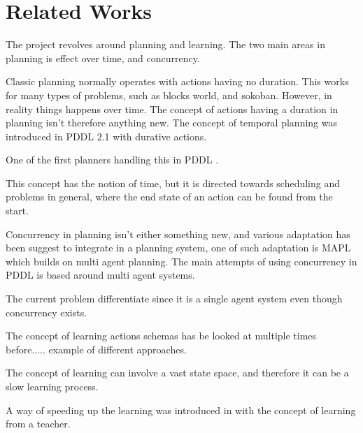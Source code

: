 \section{Related Works}
The project revolves around planning and learning. The two main areas in planning is effect over time, and concurrency. 

Classic planning normally operates with actions having no duration. This works for many types of problems, such as blocks world, and sokoban. However, in reality things happens over time. The concept of actions having a duration in planning isn't therefore anything new. The concept of temporal planning was introduced in PDDL 2.1 with durative actions. 

One of the first planners handling this in PDDL \cite{durative}. 

This concept has the notion of time, but it is directed towards scheduling and problems in general, where the end state of an action can be found from the start.
%
%	
%
%	
%	



Concurrency in planning isn't either something new, and various adaptation has been suggest to integrate in a planning system, one of such adaptation is MAPL which builds on multi agent planning\cite{mapl}. The main attempts of using concurrency in PDDL is based around multi agent systems. 

The current problem differentiate since it is a single agent system even though concurrency exists. 

The concept of learning actions schemas has be looked at multiple times before..... example of different approaches.

The concept of learning can involve a vast state space, and therefore it can be a slow learning process. 

A way of speeding up the learning was introduced in \cite{Action-Schemas} with the concept of learning from a teacher. 

